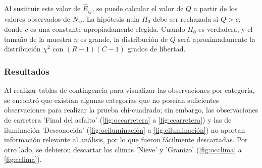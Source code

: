 \documentclass{book}
\begin{document}
Al sustituir este valor de $\hat{E}_{ij}$, se puede calcular el valor de $Q$ a partir de los valores observados de $N_{ij}$. La hipótesis nula $H_0$ debe ser rechazada si $Q > c$, donde $c$ es una constante apropiadamente elegida. Cuando $H_0$ es verdadera, y el tamaño de la muestra $n$ es grande, la distribución de $Q$ será aproximadamente la distribución $\chi^2$ con $(R - 1)(C - 1)$ grados de libertad.

\subsubsection{Resultados}
Al realizar tablas de contingencia para visualizar las observaciones por categoría, se encontró que existían algunas categorías que no poseían suficientes observaciones para realizar la prueba chi-cuadrado; sin embargo, las observaciones de carretera 'Final del asfalto' (\ref{fig:occarretera} a \ref{fig:ccarretera}) y las de iluminación 'Desconocida' (\ref{fig:ociluminación} a \ref{fig:ciluminación}) no aportan información relevante al análisis, por lo que fueron fácilmente descartadas. Por otro lado, se debieron descartar los climas 'Nieve' y 'Granizo' (\ref{fig:occlima} a \ref{fig:cclima}).
\end{document}
